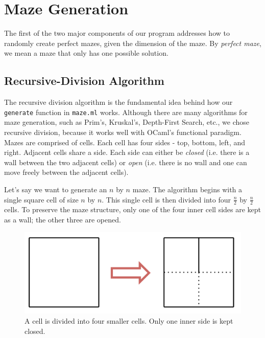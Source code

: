 \documentclass[11pt, margin=1in]{article}
\newcommand{\tab}{\par \qquad}
\begin{document}
\section{Maze Generation}

The first of the two major components of our program addresses how to randomly create perfect mazes, given the dimension of the maze. By \emph{perfect maze}, we mean a maze that only has one possible solution.    

\subsection{Recursive-Division Algorithm}  %
The recursive division algorithm is the fundamental idea behind how our \texttt{generate} function in \texttt{maze.ml} works.  Although there are many algorithms for maze generation, such as Prim's, Kruskal's, Depth-First Search, etc., we chose recursive division, because it works well with OCaml's functional paradigm.  Mazes are comprised of cells.  Each cell has four sides - top, bottom, left, and right.  Adjacent cells share a side.  Each side can either be \emph{closed} (i.e. there is a wall between the two adjacent cells) or \emph{open} (i.e. there is no wall and one can move freely between the adjacent cells).  
\tab Let's say we want to generate an $n$ by $n$ maze.  The algorithm begins with a single square cell of size $n$ by $n$.   This single cell is then divided into four $\frac{n}{2}$ by $\frac{n}{2}$ cells.  To preserve the maze structure, only one of the four inner cell sides are kept as a wall; the other three are opened.  

\begin{figure}[H]
\begin{center}
\includegraphics[scale=0.7]{gen1.jpg}
\end{center}
\caption{A cell is divided into four smaller cells.  Only one inner side is kept closed.}
\end{figure}     
\end{document}
